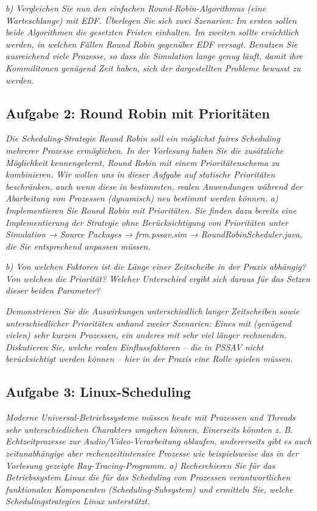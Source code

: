 \documentclass[a4paper]{article}
\begin{document}
\textit{b) Vergleichen Sie nun den einfachen Round-Robin-Algorithmus (eine Warteschlange) mit EDF. Überlegen Sie sich zwei Szenarien: Im ersten sollen beide Algorithmen die gesetzten Fristen einhalten. Im zweiten sollte ersichtlich werden, in welchen Fällen Round Robin gegenüber EDF versagt.
    Benutzen Sie ausreichend viele Prozesse, so dass die Simulation lange genug läuft, damit ihre Kommilitonen genügend Zeit haben, sich der dargestellten Probleme bewusst zu werden.}
\vspace{10mm}


\subsection{Aufgabe 2: Round Robin mit Prioritäten}
\textit{Die Scheduling-Strategie Round Robin soll ein möglichst faires Scheduling mehrerer Prozesse ermöglichen. In der Vorlesung haben Sie die zusätzliche Möglichkeit kennengelernt, Round Robin mit einem Prioritätenschema zu kombinieren. Wir wollen uns in dieser Aufgabe auf statische Prioritäten beschränken, auch wenn diese in bestimmten, realen Anwendungen während der Abarbeitung von Prozessen (dynamisch) neu bestimmt werden können.}
\vspace{10mm}
\textit{a) Implementieren Sie Round Robin mit Prioritäten. Sie finden dazu bereits eine Implementierung der Strategie ohne Berücksichtigung von Prioritäten unter Simulation → Source Packages → frm.pssav.sim → RoundRobinScheduler.java, die Sie entsprechend anpassen müssen.}
\vspace{10mm}

\textit{b) Von welchen Faktoren ist die Länge einer Zeitscheibe in der Praxis abhängig? Von welchen die Priorität? Welcher Unterschied ergibt sich daraus für das Setzen dieser beiden Parameter?}
\vspace{10mm}

\textit{Demonstrieren Sie die Auswirkungen unterschiedlich langer Zeitscheiben sowie unterschiedlicher Prioritäten anhand zweier Szenarien: Eines mit (genügend vielen) sehr kurzen Prozessen, ein anderes mit sehr viel länger rechnenden. Diskutieren Sie, welche realen Einflussfaktoren – die in PSSAV nicht berücksichtigt werden können – hier in der Praxis eine Rolle spielen müssen.}


\subsection{Aufgabe 3: Linux-Scheduling}
\textit{Moderne Universal-Betriebssysteme müssen heute mit Prozessen und Threads sehr unterschiedlichen Charakters umgehen können. Einerseits könnten z. B. Echtzeitprozesse zur Audio/Video-Verarbeitung ablaufen, andererseits gibt es auch zeitunabhängige aber rechenzeitintensive Prozesse wie beispielsweise das in der Vorlesung gezeigte Ray-Tracing-Programm.}
\vspace{10mm}
\textit{a) Recherchieren Sie für das Betriebssystem Linux die für das Scheduling von Prozessen verantwortlichen funktionalen Komponenten (Scheduling-Subsystem) und ermitteln Sie, welche Schedulingstrategien Linux unterstützt.}
\vspace{10mm}
\end{document}
